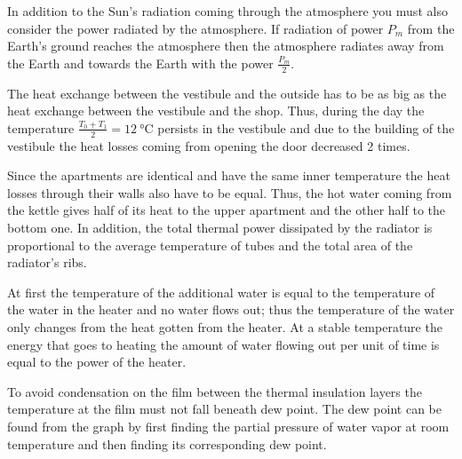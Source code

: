 \documentclass[11pt]{article}
\begin{document}
\hinteng
In addition to the Sun’s radiation coming through the atmosphere you must also consider the power radiated by the atmosphere. If radiation of power $P_m$ from the Earth’s ground reaches the atmosphere then the atmosphere radiates away from the Earth and towards the Earth with the power $\frac{P_m}{2}$.
\probend
\bigskip


\hinteng
The heat exchange between the vestibule and the outside has to be as big as the heat exchange between the vestibule and the shop. Thus, during the day the temperature $\frac{T_0+T_1}{2}=\SI{12}{\degreeCelsius}$ persists in the vestibule and due to the building of the vestibule the heat losses coming from opening the door decreased 2 times.
\probend
\bigskip


\hinteng
Since the apartments are identical and have the same inner temperature the heat losses through their walls also have to be equal. Thus, the hot water coming from the kettle gives half of its heat to the upper apartment and the other half to the bottom one. In addition, the total thermal power dissipated by the radiator is proportional to the average temperature of tubes and the total area of the radiator’s ribs.
\probend
\bigskip


\hinteng
At first the temperature of the additional water is equal to the temperature of the water in the heater and no water flows out; thus the temperature of the water only changes from the heat gotten from the heater. At a stable temperature the energy that goes to heating the amount of water flowing out per unit of time is equal to the power of the heater.
\probend
\bigskip


\hinteng
To avoid condensation on the film between the thermal insulation layers the temperature at the film must not fall beneath dew point. The dew point can be found from the graph by first finding the partial pressure of water vapor at room temperature and then finding its corresponding dew point.
\probend
\bigskip
\end{document}
